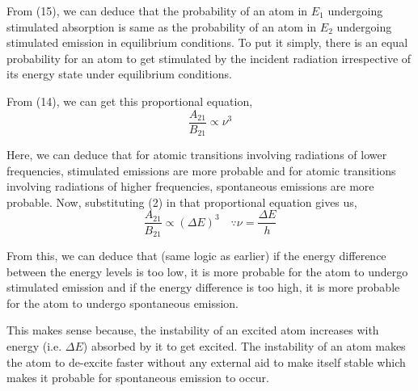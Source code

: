 \documentclass[12pt]{article}
\begin{document}
From (15), we can deduce that the probability of an atom in $E_{1}$ undergoing stimulated absorption is same as the probability of an atom in $E_{2}$ undergoing stimulated emission in equilibrium conditions. To put it simply, there is an equal probability for an atom to get stimulated by the incident radiation irrespective of its energy state under equilibrium conditions. \vspace{.2cm} 

From (14), we can get this proportional equation,
\begin{equation*}
    \frac{A_{21}}{B_{21}} \propto \nu^{3}
\end{equation*}

Here, we can deduce that for atomic transitions involving radiations of lower frequencies, stimulated emissions are more probable and for atomic transitions involving radiations of higher frequencies, spontaneous emissions are more probable. Now, substituting (2) in that proportional equation gives us,
\begin{equation}
    \frac{A_{21}}{B_{21}} \propto (\Delta E)^{3} \quad \because \nu = \frac{\Delta E}{h}
\end{equation}

From this, we can deduce that (same logic as earlier) if the energy difference between the energy levels is too low, it is more probable for the atom to undergo stimulated emission and if the energy difference is too high, it is more probable for the atom to undergo spontaneous emission. \vspace{.2cm}

This makes sense because, the instability of an excited atom increases with energy (i.e. $\Delta E$) absorbed by it to get excited. The instability of an atom makes the atom to de-excite faster without any external aid to make itself stable which makes it probable for spontaneous emission to occur.
\end{document}
